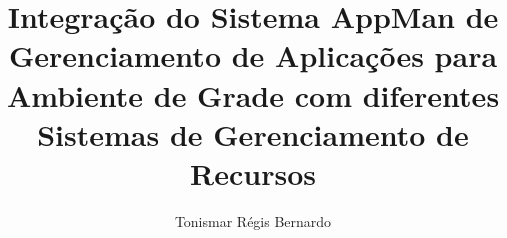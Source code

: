 \author {Tonismar Régis Bernardo}

\title {Integração do Sistema AppMan de Gerenciamento de Aplicações para Ambiente de Grade com diferentes Sistemas de Gerenciamento de Recursos}